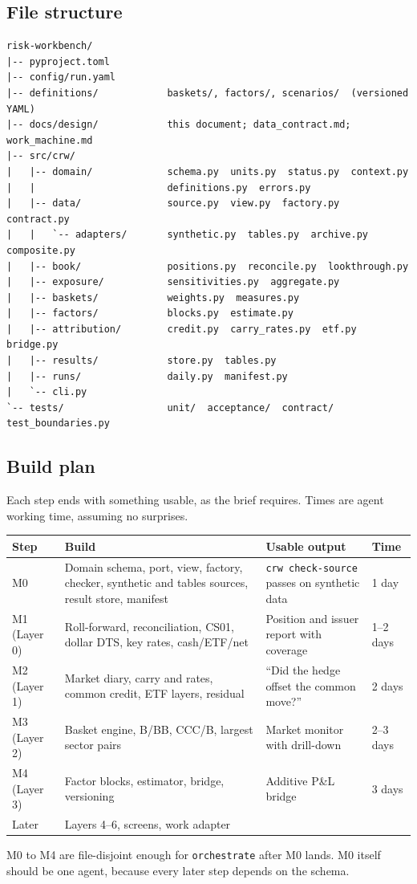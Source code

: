 \documentclass[11pt,a4paper]{article}
\newcommand{\code}[1]{\texttt{\small #1}}
\begin{document}
\subsection{File structure}
\begin{lstlisting}[language={},basicstyle=\ttfamily\footnotesize]
risk-workbench/
|-- pyproject.toml
|-- config/run.yaml
|-- definitions/            baskets/, factors/, scenarios/  (versioned YAML)
|-- docs/design/            this document; data_contract.md; work_machine.md
|-- src/crw/
|   |-- domain/             schema.py  units.py  status.py  context.py
|   |                       definitions.py  errors.py
|   |-- data/               source.py  view.py  factory.py  contract.py
|   |   `-- adapters/       synthetic.py  tables.py  archive.py  composite.py
|   |-- book/               positions.py  reconcile.py  lookthrough.py
|   |-- exposure/           sensitivities.py  aggregate.py
|   |-- baskets/            weights.py  measures.py
|   |-- factors/            blocks.py  estimate.py
|   |-- attribution/        credit.py  carry_rates.py  etf.py  bridge.py
|   |-- results/            store.py  tables.py
|   |-- runs/               daily.py  manifest.py
|   `-- cli.py
`-- tests/                  unit/  acceptance/  contract/  test_boundaries.py
\end{lstlisting}

\subsection{Build plan}
Each step ends with something usable, as the brief requires. Times are agent working time, assuming no surprises.
\begin{center}\small
\begin{tabularx}{\linewidth}{@{}lXXl@{}}\toprule
Step & Build & Usable output & Time \\\midrule
M0 & Domain schema, port, view, factory, checker, synthetic and tables sources, result store, manifest & \code{crw check-source} passes on synthetic data & 1 day \\
M1 (Layer 0) & Roll-forward, reconciliation, CS01, dollar DTS, key rates, cash/ETF/net & Position and issuer report with coverage & 1--2 days \\
M2 (Layer 1) & Market diary, carry and rates, common credit, ETF layers, residual & ``Did the hedge offset the common move?'' & 2 days \\
M3 (Layer 2) & Basket engine, B/BB, CCC/B, largest sector pairs & Market monitor with drill-down & 2--3 days \\
M4 (Layer 3) & Factor blocks, estimator, bridge, versioning & Additive P\&L bridge & 3 days \\
Later & Layers 4--6, screens, work adapter & & \\\bottomrule
\end{tabularx}
\end{center}
M0 to M4 are file-disjoint enough for \code{orchestrate} after M0 lands. M0 itself should be one agent, because every later step depends on the schema.
\end{document}
